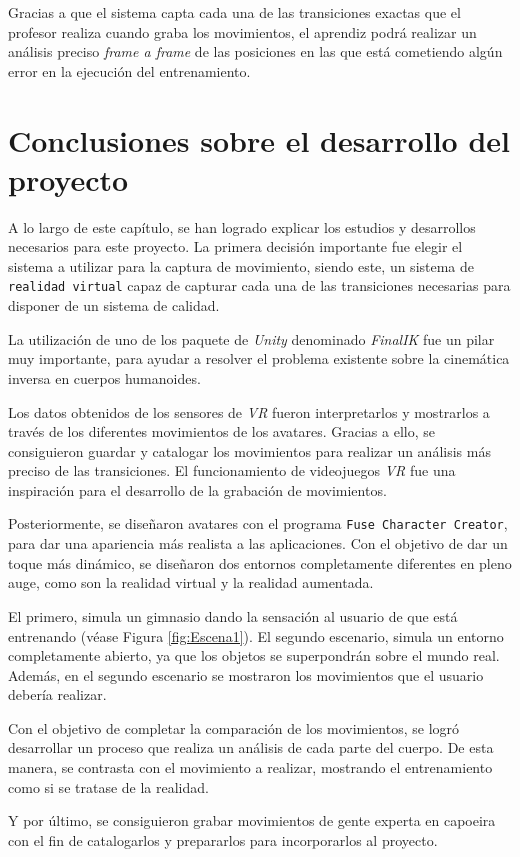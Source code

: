 Gracias a que el sistema capta cada una de las transiciones exactas que el profesor realiza cuando graba los movimientos, el aprendiz podrá realizar un análisis preciso \textit{frame a frame} de las posiciones en las que está cometiendo algún error en la ejecución del entrenamiento.

\section{Conclusiones sobre el desarrollo del proyecto}

A lo largo de este capítulo, se han logrado explicar los estudios y desarrollos necesarios para este proyecto. La primera decisión importante fue elegir el sistema a utilizar para la captura de movimiento, siendo este, un sistema de \texttt{realidad virtual} capaz de capturar cada una de las transiciones necesarias para disponer de un sistema de calidad. 

La utilización de uno de los paquete de \textit{Unity} denominado \textit{FinalIK} fue un pilar muy importante, para ayudar a resolver el problema existente sobre la cinemática inversa en cuerpos humanoides.

Los datos obtenidos de los sensores de \textit{VR} fueron interpretarlos y mostrarlos a través de los diferentes movimientos de los avatares. Gracias a ello, se consiguieron guardar y catalogar los movimientos para realizar un análisis más preciso de las transiciones. El funcionamiento de videojuegos \textit{VR} fue una inspiración para el desarrollo de la grabación de movimientos.

Posteriormente, se diseñaron avatares con el programa \texttt{Fuse Character Creator}, para dar una apariencia más realista a las aplicaciones. Con el objetivo de dar un toque más dinámico, se diseñaron dos entornos completamente diferentes en pleno auge, como son la realidad virtual y la realidad aumentada.

El primero, simula un gimnasio dando la sensación al usuario de que está entrenando (véase Figura \ref{fig:Escena1}). El segundo escenario, simula un entorno completamente abierto, ya que los objetos se superpondrán sobre el mundo real. Además, en el segundo escenario se mostraron los movimientos que el usuario debería realizar.

Con el objetivo de completar la comparación de los movimientos, se logró desarrollar un proceso que realiza un análisis de cada parte del cuerpo. De esta manera, se contrasta con el movimiento a realizar, mostrando el entrenamiento como si se tratase de la realidad.

Y por último, se consiguieron grabar movimientos de gente experta en capoeira con el fin de catalogarlos y prepararlos para incorporarlos al proyecto.


